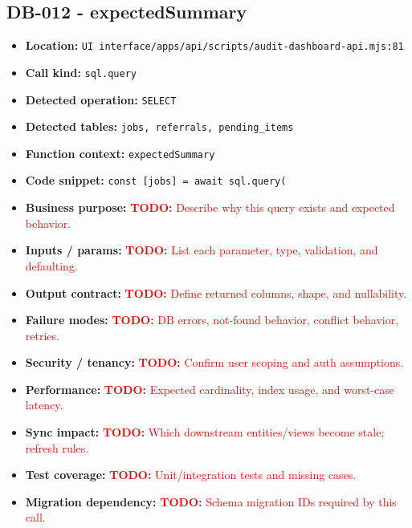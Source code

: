 \documentclass[11pt]{article}
\newcommand{\todoitem}[1]{\textcolor{red}{\textbf{TODO:} #1}}
\begin{document}
\subsection{DB-012 - expectedSummary}
\begin{itemize}[leftmargin=1.5em]
\item \textbf{Location:} \texttt{UI interface/apps/api/scripts/audit-dashboard-api.mjs:81}
\item \textbf{Call kind:} \texttt{sql.query}
\item \textbf{Detected operation:} \texttt{SELECT}
\item \textbf{Detected tables:} \texttt{jobs, referrals, pending\_items}
\item \textbf{Function context:} \texttt{expectedSummary}
\item \textbf{Code snippet:} \texttt{const [jobs] = await sql.query(}
\item \textbf{Business purpose:} \todoitem{Describe why this query exists and expected behavior.}
\item \textbf{Inputs / params:} \todoitem{List each parameter, type, validation, and defaulting.}
\item \textbf{Output contract:} \todoitem{Define returned columns, shape, and nullability.}
\item \textbf{Failure modes:} \todoitem{DB errors, not-found behavior, conflict behavior, retries.}
\item \textbf{Security / tenancy:} \todoitem{Confirm user scoping and auth assumptions.}
\item \textbf{Performance:} \todoitem{Expected cardinality, index usage, and worst-case latency.}
\item \textbf{Sync impact:} \todoitem{Which downstream entities/views become stale; refresh rules.}
\item \textbf{Test coverage:} \todoitem{Unit/integration tests and missing cases.}
\item \textbf{Migration dependency:} \todoitem{Schema migration IDs required by this call.}
\end{itemize}
\end{document}

